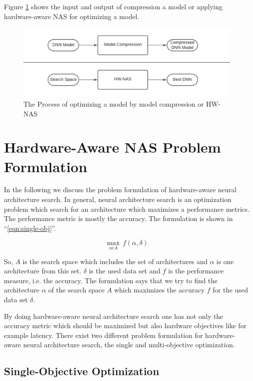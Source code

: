 \documentclass[conference]{IEEEtran}
\begin{document}
Figure \ref{fig:Optimization} \cite{bib1} shows the input and output of compression a model or applying hardware-aware NAS for optimizing a model.

\begin{figure}[htbp]
\centerline{\includegraphics[width=\linewidth]{Optimization.png}}
\caption{The Process of optimizing a model by model compression or HW-NAS \cite{bib1}}
\label{fig:Optimization}
\end{figure}

\section{Hardware-Aware NAS Problem Formulation}
\label{section:ProblemFormulation}
In the following we discuss the problem formulation of hardware-aware neural architecture search. In general, neural architecture search is an optimization problem which search for an architecture which maximizes a performance metrics. The performance metric is mostly the accuracy. The formulation is shown in ``\eqref{eqn:single-obj}''. 
 
\begin{equation}
\label{eqn:single-obj}
\max_{\alpha\epsilon A}\,f(\alpha, \delta)
\end{equation}

So, $A$ is the search space which includes the set of architectures and $\alpha$ is one architecture from this set. $\delta$ is the used data set and $f$ is the performance measure, i.e. the accuracy. The formulation says that we try to find the architecture $\alpha$ of the search space $A$ which maximizes the accuracy $f$ for the used data set $\delta$. 
 
By doing hardware-aware neural architecture search one has not only the accuracy metric which should be maximized but also hardware objectives like for example latency. There exist two different problem formulation for hardware-aware neural architecture search, the single and multi-objective optimization.

\subsection{Single-Objective Optimization}
\end{document}
